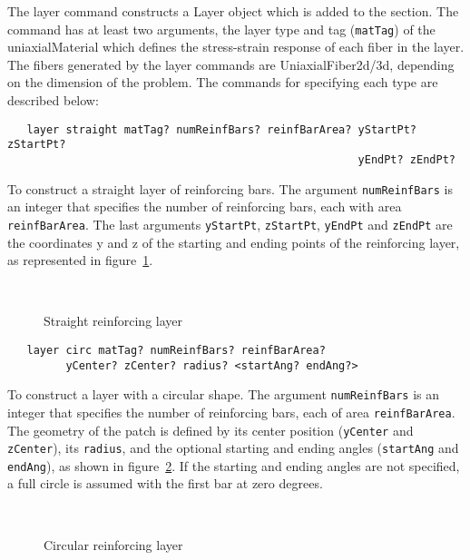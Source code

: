 \documentclass[12pt]{article}
\begin{document}
The layer command constructs a Layer object which is added to the section.
The command has at least two arguments, the layer type and tag
({\tt matTag}) of the uniaxialMaterial which defines the stress-strain
response of each fiber in the layer. The fibers
generated by the layer commands are UniaxialFiber2d/3d, depending on
the dimension of the problem. The commands
for specifying each type are described below:

{\sf\small
\begin{verbatim}
   layer straight matTag? numReinfBars? reinfBarArea? yStartPt? zStartPt? 
                                                      yEndPt? zEndPt?
\end{verbatim}
}

\noindent To construct a straight layer of reinforcing bars. The argument 
{\tt numReinfBars} is an integer that specifies the number of reinforcing 
bars, each with area {\tt reinfBarArea}. The last arguments 
{\tt yStartPt}, {\tt zStartPt}, {\tt yEndPt} and {\tt zEndPt} are the
coordinates y and z of the starting and ending points of the
reinforcing layer, as represented in figure~\ref{straightLayer}.


\begin{figure}[htpb]
\begin{center}
\leavevmode
\hbox{%
}
\end{center}
\caption{Straight reinforcing layer}
\label{straightLayer}
\end{figure}


{\sf\small
\begin{verbatim}
   layer circ matTag? numReinfBars? reinfBarArea? 
         yCenter? zCenter? radius? <startAng? endAng?>
\end{verbatim}
}

\noindent To construct a layer with a circular shape. The argument 
{\tt numReinfBars} is an integer that specifies the number of reinforcing 
bars, each of area {\tt reinfBarArea}. 
The geometry of the patch is defined by its center position
({\tt yCenter} and {\tt zCenter}), its {\tt radius}, and the optional
starting and ending angles ({\tt startAng} and {\tt endAng}), as shown in
figure~\ref{circLayer}. If the starting and ending angles are not specified,
a full circle is assumed with the first bar at zero degrees.


\begin{figure}[htpb]
\begin{center}
\leavevmode
\hbox{%
}
\end{center}
\caption{Circular reinforcing layer}
\label{circLayer}
\end{figure}
\end{document}
